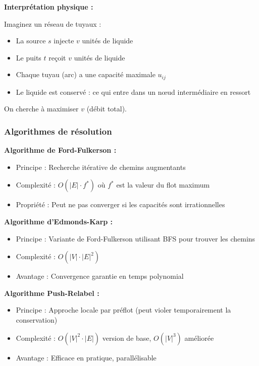 \documentclass[12pt,a4paper]{article}
\begin{document}
\begin{notecours}
\textbf{Interprétation physique :}

Imaginez un réseau de tuyaux :
\begin{itemize}
    \item La source $s$ injecte $v$ unités de liquide
    \item Le puits $t$ reçoit $v$ unités de liquide
    \item Chaque tuyau (arc) a une capacité maximale $u_{ij}$
    \item Le liquide est conservé : ce qui entre dans un nœud intermédiaire en ressort
\end{itemize}

On cherche à maximiser $v$ (débit total).
\end{notecours}

\subsubsection{Algorithmes de résolution}

\begin{algorithme}
\textbf{Algorithme de Ford-Fulkerson :}
\begin{itemize}
    \item \textcolor{titrebleu}{Principe :} Recherche itérative de chemins augmentants
    \item \textcolor{defvert}{Complexité :} $O(|E| \cdot f^*)$ où $f^*$ est la valeur du flot maximum
    \item \textcolor{algoviolet}{Propriété :} Peut ne pas converger si les capacités sont irrationnelles
\end{itemize}

\textbf{Algorithme d'Edmonds-Karp :}
\begin{itemize}
    \item \textcolor{titrebleu}{Principe :} Variante de Ford-Fulkerson utilisant BFS pour trouver les chemins
    \item \textcolor{defvert}{Complexité :} $O(|V| \cdot |E|^2)$
    \item \textcolor{algoviolet}{Avantage :} Convergence garantie en temps polynomial
\end{itemize}

\textbf{Algorithme Push-Relabel :}
\begin{itemize}
    \item \textcolor{titrebleu}{Principe :} Approche locale par préflot (peut violer temporairement la conservation)
    \item \textcolor{defvert}{Complexité :} $O(|V|^2 \cdot |E|)$ version de base, $O(|V|^3)$ améliorée
    \item \textcolor{algoviolet}{Avantage :} Efficace en pratique, parallélisable
\end{itemize}
\end{algorithme}
\end{document}
